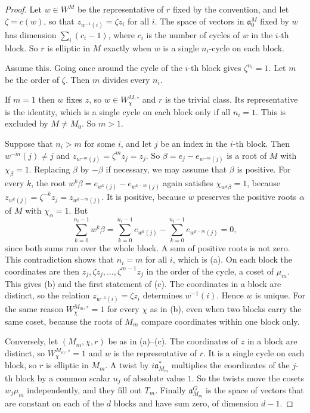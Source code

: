\documentclass[12pt,letterpaper]{article}
\numberwithin{equation}{section}
\theoremstyle{plain}
\theoremstyle{definition}
\theoremstyle{remark}
\newcommand{\fa}{\mathfrak{a}}
\begin{document}
\begin{proof}
Let $w\in W^M$ be the representative of $r$ fixed by the convention, and let $\zeta=c(w)$, so that $z_{w^{-1}(i)}=\zeta z_i$ for all $i$. The space of vectors in $\fa_0^M$ fixed by $w$ has dimension $\sum_i(c_i-1)$, where $c_i$ is the number of cycles of $w$ in the $i$-th block. So $r$ is elliptic in $M$ exactly when $w$ is a single $n_i$-cycle on each block.

Assume this. Going once around the cycle of the $i$-th block gives $\zeta^{n_i}=1$. Let $m$ be the order of $\zeta$. Then $m$ divides every $n_i$.

If $m=1$ then $w$ fixes $z$, so $w\in W^{M,\circ}_\chi$ and $r$ is the trivial class. Its representative is the identity, which is a single cycle on each block only if all $n_i=1$. This is excluded by $M\ne M_0$. So $m>1$.

Suppose that $n_i>m$ for some $i$, and let $j$ be an index in the $i$-th block. Then $w^{-m}(j)\ne j$ and $z_{w^{-m}(j)}=\zeta^mz_j=z_j$. So $\beta=e_j-e_{w^{-m}(j)}$ is a root of $M$ with $\chi_\beta=1$. Replacing $\beta$ by $-\beta$ if necessary, we may assume that $\beta$ is positive. For every $k$, the root $w^k\beta=e_{w^k(j)}-e_{w^{k-m}(j)}$ again satisfies $\chi_{w^k\beta}=1$, because $z_{w^k(j)}=\zeta^{-k}z_j=z_{w^{k-m}(j)}$. It is positive, because $w$ preserves the positive roots $\alpha$ of $M$ with $\chi_\alpha=1$. But
\[
\sum_{k=0}^{n_i-1}w^k\beta=\sum_{k=0}^{n_i-1}e_{w^k(j)}-\sum_{k=0}^{n_i-1}e_{w^{k-m}(j)}=0,
\]
since both sums run over the whole block. A sum of positive roots is not zero. This contradiction shows that $n_i=m$ for all $i$, which is (a). On each block the coordinates are then $z_j,\zeta z_j,\dots,\zeta^{m-1}z_j$ in the order of the cycle, a coset of $\mu_m$. This gives (b) and the first statement of (c). The coordinates in a block are distinct, so the relation $z_{w^{-1}(i)}=\zeta z_i$ determines $w^{-1}(i)$. Hence $w$ is unique. For the same reason $W^{M_m,\circ}_\chi=1$ for every $\chi$ as in (b), even when two blocks carry the same coset, because the roots of $M_m$ compare coordinates within one block only.

Conversely, let $(M_m,\chi,r)$ be as in (a)--(c). The coordinates of $z$ in a block are distinct, so $W^{M_m,\circ}_\chi=1$ and $w$ is the representative of $r$. It is a single cycle on each block, so $r$ is elliptic in $M_m$. A twist by $i\fa_{M_m}^*$ multiplies the coordinates of the $j$-th block by a common scalar $u_j$ of absolute value $1$. So the twists move the cosets $w_j\mu_m$ independently, and they fill out $T_m$. Finally $\fa_{M_m}^G$ is the space of vectors that are constant on each of the $d$ blocks and have sum zero, of dimension $d-1$.
\end{proof}
\end{document}
